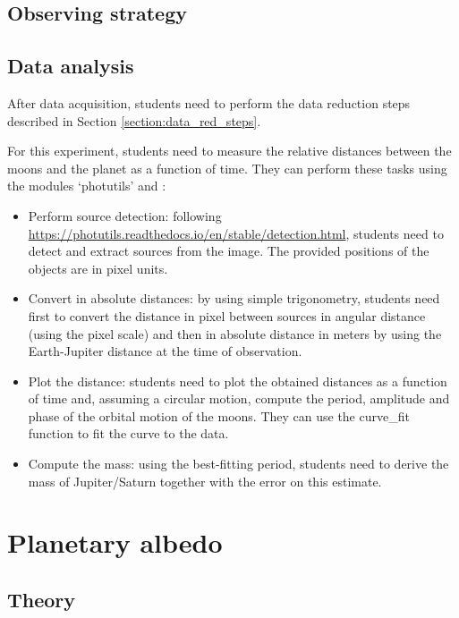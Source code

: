 \documentclass[a4paper, 11pt, fleqn]{memoir}
\begin{document}
\subsection{Observing strategy}

\subsection{Data analysis}

After data acquisition, students need to perform the data reduction steps described in Section \ref{section:data_red_steps}.

For this experiment, students need to measure the relative distances between the moons and the planet as a function of time.
They can perform these tasks using the  modules `photutils' and :
\begin{itemize}
    \item Perform source detection: following \url{https://photutils.readthedocs.io/en/stable/detection.html}, students need to detect and extract sources from the image.
          The provided positions of the objects are in pixel units.
    \item
          Convert in absolute distances: by using simple trigonometry, students need
          first to convert the distance in pixel between sources in angular distance
          (using the pixel scale) and then in absolute distance in meters by using the
          Earth-Jupiter distance at the time of observation.
    \item
          Plot the distance: students need to plot the obtained distances as a function
          of time and, assuming a circular motion, compute the period, amplitude and
          phase of the orbital motion of the moons.
          They can use the  curve\_fit function to fit the curve to the data.
    \item
          Compute the mass: using the best-fitting period, students need to derive the
          mass of Jupiter/Saturn together with the error on this estimate.
\end{itemize}

\section{Planetary albedo}

\subsection{Theory}
\label{subsection:albedo_theory}
\end{document}
